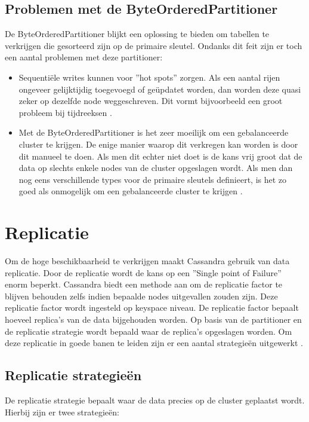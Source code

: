 \subsection{Problemen met de ByteOrderedPartitioner}
De ByteOrderedPartitioner blijkt een oplossing te bieden om tabellen te verkrijgen die gesorteerd zijn op de primaire sleutel.
Ondanks dit feit zijn er toch een aantal problemen met deze partitioner:

\begin{itemize}
	\item Sequentiële writes kunnen voor ''hot spots'' zorgen.
	Als een aantal rijen ongeveer gelijktijdig toegevoegd of geüpdatet worden, dan worden deze quasi zeker op dezelfde node weggeschreven.
	Dit vormt bijvoorbeeld een groot probleem bij tijdreeksen \citep{kan2014cassandra}.
	
	\item Met de ByteOrderedPartitioner is het zeer moeilijk om een gebalanceerde cluster te krijgen.
	De enige manier waarop dit verkregen kan worden is door dit manueel te doen.
	Als men dit echter niet doet is de kans vrij groot dat de data op slechts enkele nodes van de cluster opgeslagen wordt.
	Als men dan nog eens verschillende types voor de primaire sleutels definieert, is het zo goed als onmogelijk om een gebalanceerde cluster te krijgen
	\citep{Bauer2013CaseAgainstByteOrder}.
\end{itemize}

\section{Replicatie}
\label{sec_replication}
Om de hoge beschikbaarheid te verkrijgen maakt Cassandra gebruik van data replicatie.
Door de replicatie wordt de kans op een ''Single point of Failure'' enorm beperkt.
Cassandra biedt een methode aan om de replicatie factor te blijven behouden zelfs indien bepaalde nodes uitgevallen zouden zijn.
Deze replicatie factor wordt ingesteld op keyspace niveau.
De replicatie factor bepaalt hoeveel replica's van de data bijgehouden worden.
Op basis van de partitioner en de replicatie strategie wordt  bepaald waar de replica's opgeslagen worden.
Om deze replicatie in goede banen te leiden zijn er een aantal strategieën uitgewerkt \citep{kan2014cassandra}.

\subsection{Replicatie strategieën}
De replicatie strategie bepaalt waar de data precies op de cluster geplaatst wordt.
Hierbij zijn er twee strategieën:

